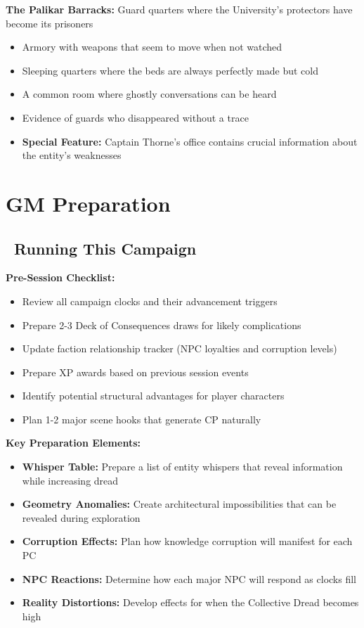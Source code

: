 \documentclass[11pt]{article}
\begin{document}
\textbf{The Palikar Barracks:}
Guard quarters where the University's protectors have become its prisoners
\begin{itemize}
    \item Armory with weapons that seem to move when not watched
    \item Sleeping quarters where the beds are always perfectly made but cold
    \item A common room where ghostly conversations can be heard
    \item Evidence of guards who disappeared without a trace
    \item \textbf{Special Feature:} Captain Thorne's office contains crucial information about the entity's weaknesses
\end{itemize}

\section{GM Preparation}

\subsection*{\faDice\ Running This Campaign}

\textbf{Pre-Session Checklist:}
\begin{itemize}
    \item Review all campaign clocks and their advancement triggers
    \item Prepare 2-3 Deck of Consequences draws for likely complications
    \item Update faction relationship tracker (NPC loyalties and corruption levels)
    \item Prepare XP awards based on previous session events
    \item Identify potential structural advantages for player characters
    \item Plan 1-2 major scene hooks that generate CP naturally
\end{itemize}

\textbf{Key Preparation Elements:}
\begin{itemize}
    \item \textbf{Whisper Table:} Prepare a list of entity whispers that reveal information while increasing dread
    \item \textbf{Geometry Anomalies:} Create architectural impossibilities that can be revealed during exploration
    \item \textbf{Corruption Effects:} Plan how knowledge corruption will manifest for each PC
    \item \textbf{NPC Reactions:} Determine how each major NPC will respond as clocks fill
    \item \textbf{Reality Distortions:} Develop effects for when the Collective Dread becomes high
\end{itemize}
\end{document}
